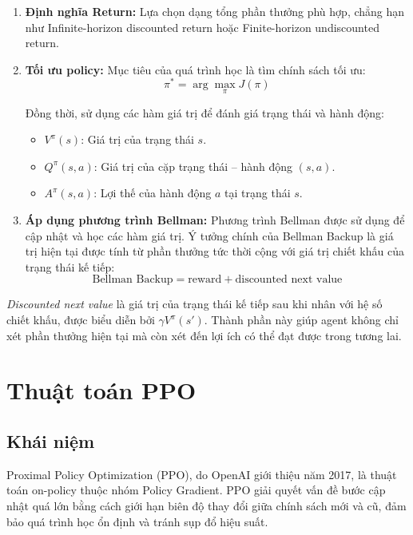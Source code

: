 \begin{itemize}
\begin{enumerate}[leftmargin=1.5cm]
    \item \textbf{Định nghĩa Return:} Lựa chọn dạng tổng phần thưởng phù hợp, chẳng hạn
    như Infinite-horizon discounted return hoặc Finite-horizon undiscounted return.

    \item \textbf{Tối ưu policy:} Mục tiêu của quá trình học là tìm chính sách tối ưu:
    \begin{equation}
        \pi^* = \arg\max_{\pi} J(\pi)
        \label{eq:optimize_policy}
    \end{equation}

    Đồng thời, sử dụng các hàm giá trị để đánh giá trạng thái và hành động:
    \begin{itemize}[leftmargin=1.5cm]
        \item $V^\pi(s)$: Giá trị của trạng thái $s$.
        \item $Q^\pi(s,a)$: Giá trị của cặp trạng thái -- hành động $(s,a)$.
        \item $A^\pi(s,a)$: Lợi thế của hành động $a$ tại trạng thái $s$.
    \end{itemize}

    \item \textbf{Áp dụng phương trình Bellman:} Phương trình Bellman được sử dụng
    để cập nhật và học các hàm giá trị. Ý tưởng chính của Bellman Backup là giá trị
    hiện tại được tính từ phần thưởng tức thời cộng với giá trị chiết khấu của trạng thái
    kế tiếp:
    \begin{equation}
        \text{Bellman Backup}
        =
        \text{reward}
        +
        \text{discounted next value}
    \end{equation}
\end{enumerate}
\textit{Discounted next value} là giá trị của trạng thái kế tiếp sau khi nhân với hệ số
chiết khấu, được biểu diễn bởi $\gamma V^\pi(s')$. Thành phần này giúp agent không chỉ
xét phần thưởng hiện tại mà còn xét đến lợi ích có thể đạt được trong tương lai.
\section{Thuật toán PPO}

\subsection{Khái niệm}

Proximal Policy Optimization (PPO), do OpenAI giới thiệu năm 2017, là thuật
toán on-policy thuộc nhóm Policy Gradient. PPO giải quyết vấn đề bước cập nhật
quá lớn bằng cách giới hạn biên độ thay đổi giữa chính sách mới và cũ, đảm bảo
quá trình học ổn định và tránh sụp đổ hiệu suất.


\end{itemize}
